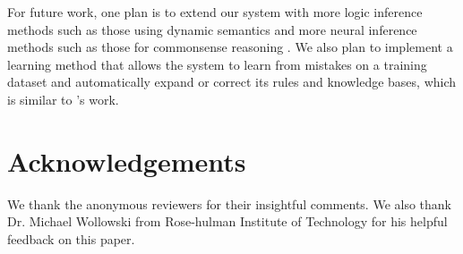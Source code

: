 \documentclass[11pt,a4paper]{article}
\begin{document}
For future work, one plan
is to extend our system with more logic inference methods such as those using dynamic semantics \cite{haruta-etal-2020-combining} and more neural inference methods such as those for commonsense reasoning \cite{levine-etal-2020-sensebert}. We also plan to implement a learning method that allows the system to learn from mistakes on a training dataset and automatically expand or correct its rules and knowledge bases, which is similar to \citet{abzianidze-2020-learning}'s work.   

\section*{Acknowledgements}
We thank the anonymous reviewers for their insightful comments. We also thank Dr. Michael Wollowski from Rose-hulman Institute of Technology for his helpful feedback on this paper.



\end{document}
